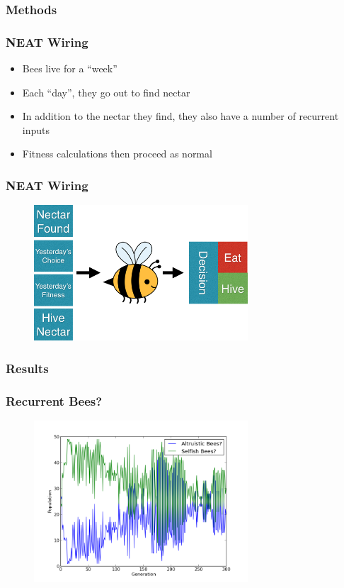 \documentclass{beamer}
\begin{document}
      \subsubsection{Methods} %
      \label{ssub:methods}
        \begin{frame}[c]\frametitle{NEAT Wiring}
            
          \begin{itemize}
            \item Bees live for a ``week'' %
            \item Each ``day'', they go out to find nectar
            \item In addition to the nectar they find, they also have a number of recurrent inputs
            \item Fitness calculations then proceed as normal
          \end{itemize}
        
        \end{frame}
        \begin{frame}[c]\frametitle{NEAT Wiring}
          \begin{figure}
          \includegraphics[width=8cm]{bee_diagrams/recurrent_system.png}
          \end{figure}
        \end{frame}

      \subsubsection{Results} %
      \label{ssub:results}
         \begin{frame}[t]\frametitle{Recurrent Bees?}
          \begin{figure}
          \includegraphics[width=8cm]{results/recurrent_bees.png}
          \end{figure}
        \end{frame}
\end{document}
